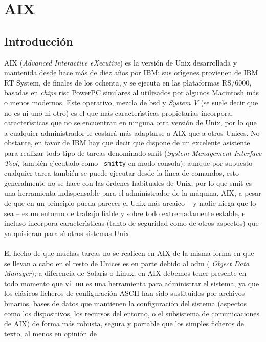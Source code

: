 \chapter{AIX}
\section{Introducci\'on}
AIX ({\it Advanced Interactive eXecutive}) es la versi\'on de Unix desarrollada 
y mantenida desde hace m\'as de diez
a\~nos por IBM; sus or\'{\i}genes provienen de IBM RT System, de finales de los 
ochenta, y se ejecuta en las plataformas RS/6000, basadas en {\it chips} {\sc 
risc} PowerPC similares al utilizados por algunos Macintosh m\'as o menos 
modernos. Este operativo, mezcla de {\sc bsd} y {\it System V} (se suele decir
que no es ni uno ni otro) es el que m\'as caracter\'{\i}sticas propietarias 
incorpora, caracter\'{\i}sticas que no se encuentran en ninguna otra versi\'on 
de Unix, por lo que a cualquier administrador le costar\'a m\'as adaptarse a 
AIX que a otros Unices. No obstante, en favor de IBM hay que decir que dispone
de un excelente asistente para realizar todo tipo de tareas denominado {\sc 
smit} ({\it System Management Interface Tool}, tambi\'en ejecutado como {\tt 
smitty} en modo consola): aunque por supuesto cualquier tarea tambi\'en se 
puede ejecutar desde la l\'{\i}nea de comandos, esto generalmente no se hace 
con las \'ordenes habituales de Unix, por lo que {\sc smit} es una herramienta
indispensable para el administrador de la m\'aquina. AIX, a pesar de que en un 
principio pueda parecer el Unix m\'as arcaico -- y nadie niega que lo sea -- es 
un entorno de trabajo fiable y sobre todo extremadamente estable, e incluso 
incorpora caracter\'{\i}sticas (tanto de seguridad como de otros aspectos) que 
ya quisieran para s\'{\i} otros sistemas Unix.\\
\\El hecho de que muchas tareas no se realicen en AIX de la misma forma en que 
se llevan a cabo en el resto de Unices es en parte debido al {\sc odm} ({\it
Object Data Manager}); a diferencia de Solaris o Linux, en AIX debemos tener
presente en todo momento que {\tt vi} {\bf no} es una herramienta para 
administrar el sistema, ya que los cl\'asicos ficheros de configuraci\'on {\sc 
ASCII} han sido sustituidos por archivos binarios, bases de datos que mantienen
la configuraci\'on del sistema (aspectos como los dispositivos, los recursos 
del entorno, o el subsistema de comunicaciones de AIX) de forma m\'as robusta, 
segura y portable que los simples ficheros de texto, al menos en opini\'on de 
